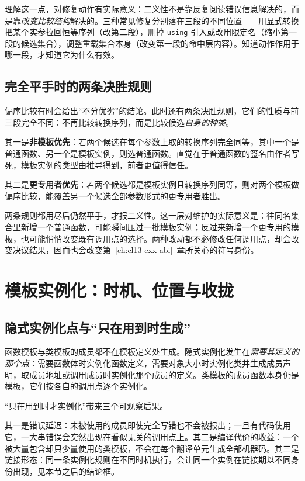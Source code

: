 \documentclass[12pt,a4paper,fontset=fandol]{ctexbook}
\newcommand{\Tp}[1]{\texttt{#1}}
\begin{document}
理解这一点，对修复动作有实际意义：二义性不是靠反复阅读错误信息解决的，而是靠\emph{改变比较结构}解决的。三种常见修复分别落在三段的不同位置——用显式转换把某个实参拉回恒等序列（改第二段），删掉 \Tp{using} 引入或改用限定名（缩小第一段的候选集合），调整重载集合本身（改变第一段的命中层内容）。知道动作作用于哪一段，才知道它为什么有效。

\subsection{完全平手时的两条决胜规则}\label{sec:cl03-tiebreak}

偏序比较有时会给出“不分优劣”的结论。此时还有两条决胜规则，它们的性质与前三段完全不同：不再比较转换序列，而是比较候选\emph{自身的种类}。

其一是\textbf{非模板优先}：若两个候选在每个参数上取的转换序列完全同等，其中一个是普通函数、另一个是模板实例，则选普通函数。直觉在于普通函数的签名由作者写死，模板实例的类型由推导得到，前者更值得信任。

其二是\textbf{更专用者优先}：若两个候选都是模板实例且转换序列同等，则对两个模板做偏序比较，能覆盖另一个候选全部参数形式的更专用者胜出。

两条规则都用尽后仍然平手，才报二义性。这一层对维护的实际意义是：往同名集合里新增一个普通函数，可能瞬间压过一批模板实例；反过来新增一个更专用的模板，也可能悄悄改变既有调用点的选择。两种改动都不必修改任何调用点，却会改变决议结果，因而也会改变第~\ref{ch:cl13-cxx-abi}~章所关心的符号身份。

\section{模板实例化：时机、位置与收拢}\label{sec:cl03-instantiation}

\subsection{隐式实例化点与“只在用到时生成”}\label{sec:cl03-implicit}

函数模板与类模板的成员都不在模板定义处生成。隐式实例化发生在\emph{需要其定义的那个点}：需要函数体时实例化函数定义，需要对象大小时实例化类并生成成员声明，取成员地址或调用成员时实例化那个成员的定义。类模板的成员函数本身仍是模板，它们按各自的调用点逐个实例化。

“只在用到时才实例化”带来三个可观察后果。

其一是错误延迟：未被使用的成员即使完全写错也不会被报出；一旦有代码使用它，一大串错误会突然出现在看似无关的调用点上。其二是编译代价的收益：一个被大量包含却只少量使用的类模板，不会在每个翻译单元生成全部机器码。其三是链接形态：同一条实例化规则在不同时机执行，会让同一个实例在链接期以不同身份出现，见本节之后的结论框。
\end{document}
